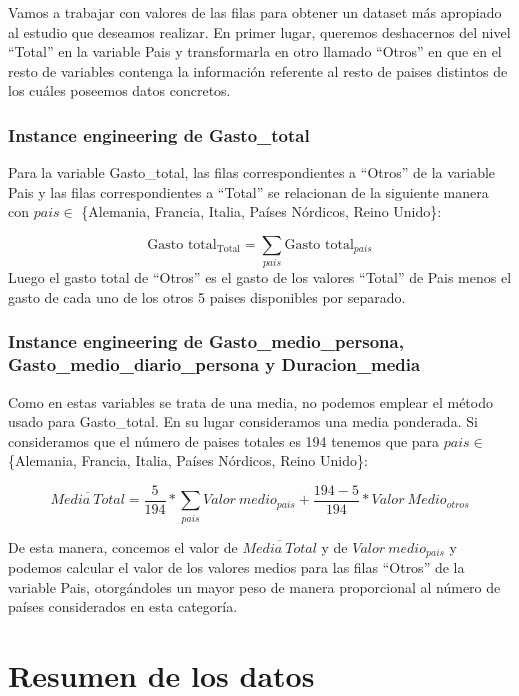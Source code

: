 \documentclass[data,article,submit,moreauthors,pdftex]{Definitions/mdpi}
\begin{document}
Vamos a trabajar con valores de las filas para obtener un dataset más
apropiado al estudio que deseamos realizar. En primer lugar, queremos
deshacernos del nivel ``Total'' en la variable Pais y transformarla en
otro llamado ``Otros'' en que en el resto de variables contenga la
información referente al resto de paises distintos de los cuáles
poseemos datos concretos.

\subsubsection{Instance engineering de
Gasto\_total}\label{instance-engineering-de-gasto_total}

Para la variable Gasto\_total, las filas correspondientes a ``Otros'' de
la variable Pais y las filas correspondientes a ``Total'' se relacionan
de la siguiente manera con \(pais\in\) \{Alemania, Francia, Italia,
Países Nórdicos, Reino Unido\}:

\[ \text{Gasto total}_{\text{Total}} = \sum_{pais}{\text{Gasto total}_{pais}}\]
Luego el gasto total de ``Otros'' es el gasto de los valores ``Total''
de Pais menos el gasto de cada uno de los otros 5 paises disponibles por
separado.

\subsubsection{Instance engineering de Gasto\_medio\_persona,
Gasto\_medio\_diario\_persona y
Duracion\_media}\label{instance-engineering-de-gasto_medio_persona-gasto_medio_diario_persona-y-duracion_media}

Como en estas variables se trata de una media, no podemos emplear el
método usado para Gasto\_total. En su lugar consideramos una media
ponderada. Si consideramos que el número de paises totales es 194
tenemos que para \(pais \in\) \{Alemania, Francia, Italia, Países
Nórdicos, Reino Unido\}:

\[
 \overline{Media\ Total} = \frac{5}{194}*\sum_{pais}{Valor\ medio}_{pais} + \frac{194-5}{194}*Valor \ Medio_{otros}
\]

De esta manera, concemos el valor de \(\overline{Media\ Total}\) y de
\({Valor\ medio}_{pais}\) y podemos calcular el valor de los valores
medios para las filas ``Otros'' de la variable Pais, otorgándoles un
mayor peso de manera proporcional al número de países considerados en
esta categoría.

\section{Resumen de los datos}\label{resumen-de-los-datos}
\end{document}
